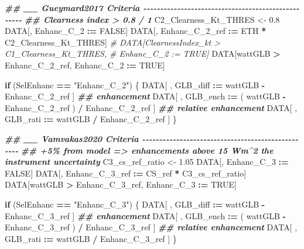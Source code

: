 \documentclass[
  10pt,
  a4paper,oneside]{article}
\newenvironment{Shaded}{\begin{snugshade}}{\end{snugshade}}
\newcommand{\CommentTok}[1]{\textcolor[rgb]{0.56,0.35,0.01}{\textit{#1}}}
\newcommand{\ConstantTok}[1]{\textcolor[rgb]{0.56,0.35,0.01}{#1}}
\newcommand{\ControlFlowTok}[1]{\textcolor[rgb]{0.13,0.29,0.53}{\textbf{#1}}}
\newcommand{\DocumentationTok}[1]{\textcolor[rgb]{0.56,0.35,0.01}{\textbf{\textit{#1}}}}
\newcommand{\FloatTok}[1]{\textcolor[rgb]{0.00,0.00,0.81}{#1}}
\newcommand{\NormalTok}[1]{#1}
\newcommand{\OtherTok}[1]{\textcolor[rgb]{0.56,0.35,0.01}{#1}}
\newcommand{\SpecialCharTok}[1]{\textcolor[rgb]{0.81,0.36,0.00}{\textbf{#1}}}
\newcommand{\StringTok}[1]{\textcolor[rgb]{0.31,0.60,0.02}{#1}}
\begin{document}
\begin{Shaded}
\begin{Highlighting}[]
\DocumentationTok{\#\# \_\_ Gueymard2017 Criteria  {-}{-}{-}{-}{-}{-}{-}{-}{-}{-}{-}{-}{-}{-}{-}{-}{-}{-}{-}{-}{-}{-}{-}{-}{-}{-}{-}{-}{-}{-}{-}{-}{-}{-}{-}{-}{-}{-}{-}{-}{-}{-}{-}{-}{-}{-}{-}{-}{-}{-}{-}}
\DocumentationTok{\#\# Clearness index \textgreater{} 0.8 / 1}
\NormalTok{C2\_Clearness\_Kt\_THRES }\OtherTok{\textless{}{-}} \FloatTok{0.8}
\NormalTok{DATA[, Enhanc\_C\_2 }\SpecialCharTok{:=} \ConstantTok{FALSE}\NormalTok{]}
\NormalTok{DATA[, Enhanc\_C\_2\_ref }\SpecialCharTok{:=}\NormalTok{ ETH }\SpecialCharTok{*}\NormalTok{ C2\_Clearness\_Kt\_THRES]}
\CommentTok{\# DATA[ClearnessIndex\_kt \textgreater{} C1\_Clearness\_Kt\_THRES,}
\CommentTok{\#      Enhanc\_C\_2 := TRUE]}
\NormalTok{DATA[wattGLB }\SpecialCharTok{\textgreater{}}\NormalTok{ Enhanc\_C\_2\_ref,}
\NormalTok{     Enhanc\_C\_2 }\SpecialCharTok{:=} \ConstantTok{TRUE}\NormalTok{]}

\ControlFlowTok{if}\NormalTok{ (SelEnhanc }\SpecialCharTok{==} \StringTok{"Enhanc\_C\_2"}\NormalTok{) \{}
\NormalTok{    DATA[ , GLB\_diff }\SpecialCharTok{:=}\NormalTok{   wattGLB }\SpecialCharTok{{-}}\NormalTok{ Enhanc\_C\_2\_ref                    ] }\DocumentationTok{\#\# enhancement}
\NormalTok{    DATA[ , GLB\_ench }\SpecialCharTok{:=}\NormalTok{ ( wattGLB }\SpecialCharTok{{-}}\NormalTok{ Enhanc\_C\_2\_ref ) }\SpecialCharTok{/}\NormalTok{ Enhanc\_C\_2\_ref ] }\DocumentationTok{\#\# relative enhancement}
\NormalTok{    DATA[ , GLB\_rati }\SpecialCharTok{:=}\NormalTok{   wattGLB }\SpecialCharTok{/}\NormalTok{ Enhanc\_C\_2\_ref                    ]}
\NormalTok{\}}



\DocumentationTok{\#\# \_\_ Vamvakas2020  Criteria  {-}{-}{-}{-}{-}{-}{-}{-}{-}{-}{-}{-}{-}{-}{-}{-}{-}{-}{-}{-}{-}{-}{-}{-}{-}{-}{-}{-}{-}{-}{-}{-}{-}{-}{-}{-}{-}{-}{-}{-}{-}{-}{-}{-}{-}{-}{-}{-}{-}{-}}
\DocumentationTok{\#\# +5\% from model =\textgreater{} enhancements above 15 Wm\^{}2 the instrument uncertainty}
\NormalTok{C3\_cs\_ref\_ratio }\OtherTok{\textless{}{-}} \FloatTok{1.05}
\NormalTok{DATA[, Enhanc\_C\_3 }\SpecialCharTok{:=} \ConstantTok{FALSE}\NormalTok{]}
\NormalTok{DATA[, Enhanc\_C\_3\_ref }\SpecialCharTok{:=}\NormalTok{ CS\_ref }\SpecialCharTok{*}\NormalTok{ C3\_cs\_ref\_ratio]}
\NormalTok{DATA[wattGLB }\SpecialCharTok{\textgreater{}}\NormalTok{ Enhanc\_C\_3\_ref,}
\NormalTok{     Enhanc\_C\_3 }\SpecialCharTok{:=} \ConstantTok{TRUE}\NormalTok{]}

\ControlFlowTok{if}\NormalTok{ (SelEnhanc }\SpecialCharTok{==} \StringTok{"Enhanc\_C\_3"}\NormalTok{) \{}
\NormalTok{    DATA[ , GLB\_diff }\SpecialCharTok{:=}\NormalTok{   wattGLB }\SpecialCharTok{{-}}\NormalTok{ Enhanc\_C\_3\_ref                    ] }\DocumentationTok{\#\# enhancement}
\NormalTok{    DATA[ , GLB\_ench }\SpecialCharTok{:=}\NormalTok{ ( wattGLB }\SpecialCharTok{{-}}\NormalTok{ Enhanc\_C\_3\_ref ) }\SpecialCharTok{/}\NormalTok{ Enhanc\_C\_3\_ref ] }\DocumentationTok{\#\# relative enhancement}
\NormalTok{    DATA[ , GLB\_rati }\SpecialCharTok{:=}\NormalTok{   wattGLB }\SpecialCharTok{/}\NormalTok{ Enhanc\_C\_3\_ref                    ]}
\NormalTok{\}}







\end{Highlighting}
\end{Shaded}
\end{document}
